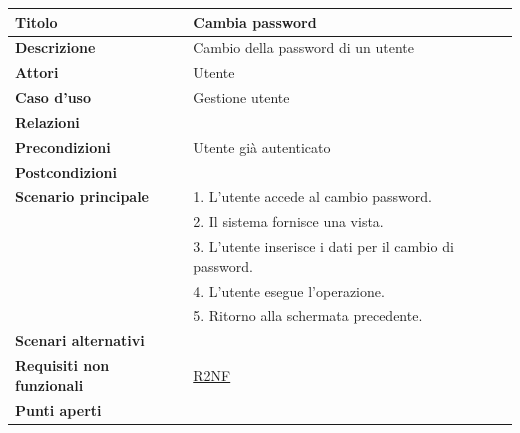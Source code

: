 \documentclass[a4paper]{article}
\begin{document}
\begin{center}
\begin{tabularx}{1\textwidth}{|l|X|}
    \hline
	\textbf{Titolo} & Cambia password \\
	\hline
	\textbf{Descrizione} & Cambio della password di un utente \\
	\hline
	\textbf{Attori} & Utente \\
	\hline
	\textbf{Caso d'uso} & Gestione utente \\
	\hline
	\textbf{Relazioni} &  \\
	\hline
	\textbf{Precondizioni} & Utente già autenticato \\
	\hline
	\textbf{Postcondizioni} &  \\
	\hline
	\textbf{Scenario principale} & 1. L'utente accede al cambio password. \\
								 & 2. Il sistema fornisce una vista. \\
								 & 3. L'utente inserisce i dati per il cambio di password. \\
								 & 4. L'utente esegue l'operazione.\\
								 & 5. Ritorno alla schermata precedente.\\
	\hline
	\textbf{Scenari alternativi} & \\
	\hline
	\textbf{Requisiti non funzionali} & \hyperlink{R2NF}{R2NF} \\
	\hline
	\textbf{Punti aperti} & \\
	\hline
\end{tabularx}
\end{center}

\end{document}
